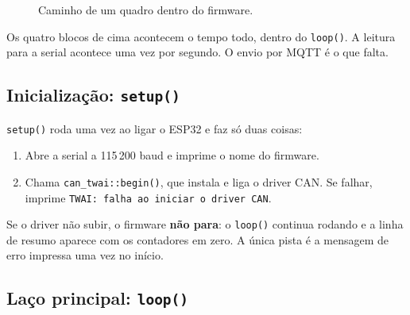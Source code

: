 \documentclass[11pt,a4paper]{article}
\begin{document}
\begin{figure}[h]
\centering
{}
\caption{Caminho de um quadro dentro do firmware.}
\end{figure}

Os quatro blocos de cima acontecem o tempo todo, dentro do \texttt{loop()}. A leitura para a serial acontece uma vez por segundo. O envio por MQTT é o que falta.

\subsection{Inicialização: \texttt{setup()}}

\texttt{setup()} roda uma vez ao ligar o ESP32 e faz só duas coisas:

\begin{enumerate}
    \item Abre a serial a 115\,200 baud e imprime o nome do firmware.
    \item Chama \texttt{can\_twai::begin()}, que instala e liga o driver CAN. Se falhar, imprime \texttt{TWAI: falha ao iniciar o driver CAN}.
\end{enumerate}

Se o driver não subir, o firmware \textbf{não para}: o \texttt{loop()} continua rodando e a linha de resumo aparece com os contadores em zero. A única pista é a mensagem de erro impressa uma vez no início.

\subsection{Laço principal: \texttt{loop()}}
\end{document}
